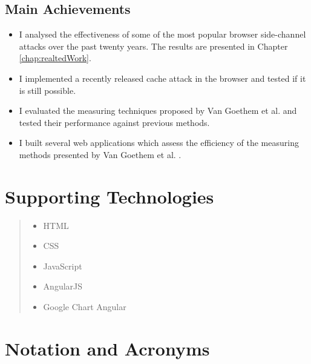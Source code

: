 \documentclass[10pt,a4paper,twoside]{book}
\begin{document}
\section*{Main Achievements}

\begin{itemize}
\item I analysed the effectiveness of some of the most popular browser side-channel attacks over the past twenty years. The results are presented in Chapter \ref{chap:realtedWork}.
\item I implemented a recently released cache attack in the browser and tested if it is still possible.
\item I evaluated the measuring techniques proposed by Van Goethem et al. \cite{van2015clock} and tested their performance against previous methods. 
\item I built several web applications which assess the efficiency of the measuring methods presented by Van Goethem et al. \cite{van2015clock}.
\end{itemize}


\chapter*{Supporting Technologies}

\begin{quote}
\noindent
\begin{itemize}
\item HTML
\item CSS
\item JavaScript
\item AngularJS
\item Google Chart Angular
\end{itemize}
\end{quote}


\chapter*{Notation and Acronyms}


\end{document}

